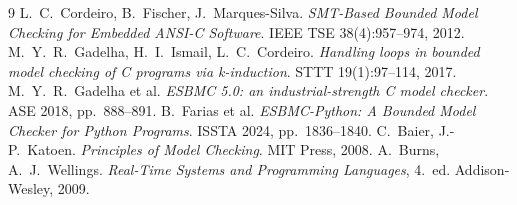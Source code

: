 \documentclass[12pt,a4paper]{article}
\begin{document}
\newpage

\begin{thebibliography}{9}
 L.~C.~Cordeiro, B.~Fischer, J.~Marques-Silva. \emph{SMT-Based
  Bounded Model Checking for Embedded ANSI-C Software}. IEEE TSE 38(4):957--974, 2012.
 M.~Y.~R.~Gadelha, H.~I.~Ismail, L.~C.~Cordeiro. \emph{Handling loops
  in bounded model checking of C programs via k-induction}. STTT 19(1):97--114, 2017.
 M.~Y.~R.~Gadelha et al. \emph{ESBMC 5.0: an industrial-strength C
  model checker}. ASE 2018, pp.~888--891.
 B.~Farias et al. \emph{ESBMC-Python: A Bounded Model Checker for
  Python Programs}. ISSTA 2024, pp.~1836--1840.
 C.~Baier, J.-P.~Katoen. \emph{Principles of Model Checking}. MIT
  Press, 2008.
 A.~Burns, A.~J.~Wellings. \emph{Real-Time Systems and Programming
  Languages}, 4.\ ed. Addison-Wesley, 2009.
\end{thebibliography}
\end{document}

